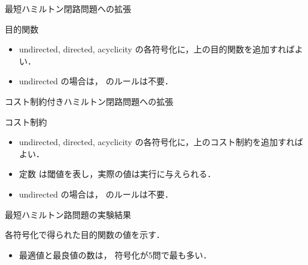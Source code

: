 \documentclass[dvipdfmx]{beamer}
\begin{document}
\begin{frame}{最短ハミルトン閉路問題への拡張}
\begin{exampleblock}{目的関数}
 
\end{exampleblock}


\begin{itemize}
\item \textsf{undirected}, \textsf{directed}, \textsf{acyclicity}
  の各符号化に，上の目的関数を追加すればよい．
\item \textsf{undirected} の場合は， のルールは不要．
\end{itemize}
\end{frame}
\begin{frame}{コスト制約付きハミルトン閉路問題への拡張}
\begin{exampleblock}{コスト制約}

\end{exampleblock}

\begin{itemize}
\item \textsf{undirected}, \textsf{directed}, \textsf{acyclicity}
  の各符号化に，上のコスト制約を追加すればよい．
\item 定数  は閾値を表し，実際の値は実行に与えられる．
\item \textsf{undirected} の場合は， のルールは不要．
\end{itemize}
\end{frame}
\begin{frame}{最短ハミルトン路問題の実験結果}
\begin{block}{}\centering
  各符号化で得られた目的関数の値を示す．    
\end{block}
  
\begin{center}
\end{center}

\begin{itemize}
\item 最適値と最良値の数は，
       符号化が5問で最も多い．
\end{itemize}
\end{frame}
\end{document}
